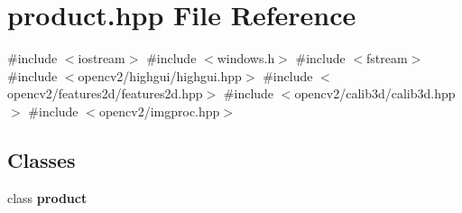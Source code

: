 \section{product.\+hpp File Reference}
\label{product_8hpp}
{\ttfamily \#include $<$iostream$>$}\newline
{\ttfamily \#include $<$windows.\+h$>$}\newline
{\ttfamily \#include $<$fstream$>$}\newline
{\ttfamily \#include $<$opencv2/highgui/highgui.\+hpp$>$}\newline
{\ttfamily \#include $<$opencv2/features2d/features2d.\+hpp$>$}\newline
{\ttfamily \#include $<$opencv2/calib3d/calib3d.\+hpp$>$}\newline
{\ttfamily \#include $<$opencv2/imgproc.\+hpp$>$}\newline
\subsection*{Classes}
\begin{DoxyCompactItemize}
\item 
class \textbf{ product}
\end{DoxyCompactItemize}
